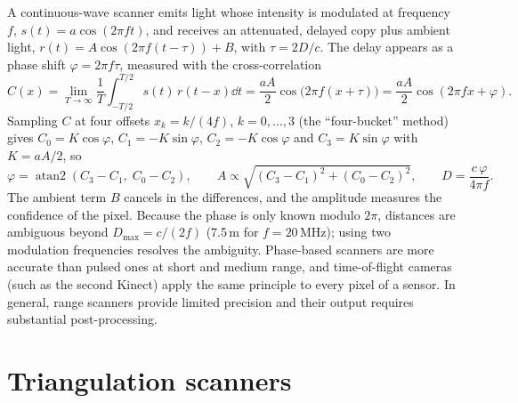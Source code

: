 A continuous-wave scanner emits light whose intensity is modulated at frequency $f$,
$s(t)=a\cos(2\pi ft)$, and receives an attenuated, delayed copy plus ambient light,
$r(t)=A\cos(2\pi f(t-\tau))+B$, with $\tau=2D/c$. The delay appears as a phase shift
$\varphi=2\pi f\tau$, measured with the cross-correlation
\begin{equation}
C(x)=\lim_{T\to\infty}\frac1T\int_{-T/2}^{T/2}s(t)\,r(t-x)\dd t=\frac{aA}{2}\cos\bigl(2\pi f(x+\tau)\bigr)=\frac{aA}{2}\cos(2\pi fx+\varphi) .
\end{equation}
Sampling $C$ at four offsets $x_k=k/(4f)$, $k=0,\dots,3$ (the ``four-bucket'' method) gives
$C_0=K\cos\varphi$, $C_1=-K\sin\varphi$, $C_2=-K\cos\varphi$ and $C_3=K\sin\varphi$ with
$K=aA/2$, so
\begin{equation}
\varphi=\operatorname{atan2}(C_3-C_1,\;C_0-C_2),\qquad A\propto\sqrt{(C_3-C_1)^2+(C_0-C_2)^2},\qquad
D=\frac{c\,\varphi}{4\pi f} .
\end{equation}
The ambient term $B$ cancels in the differences, and the amplitude measures the confidence of the
pixel. Because the phase is only known modulo $2\pi$, distances are ambiguous beyond
$D_{\max}=c/(2f)$ (7.5\,m for $f=20$\,MHz); using two modulation frequencies resolves the
ambiguity. Phase-based scanners are more accurate than pulsed ones at short and medium range, and
time-of-flight cameras (such as the second Kinect) apply the same principle to every pixel of a
sensor. In general, range scanners provide limited precision and their output requires substantial
post-processing.


\section{Triangulation scanners}

